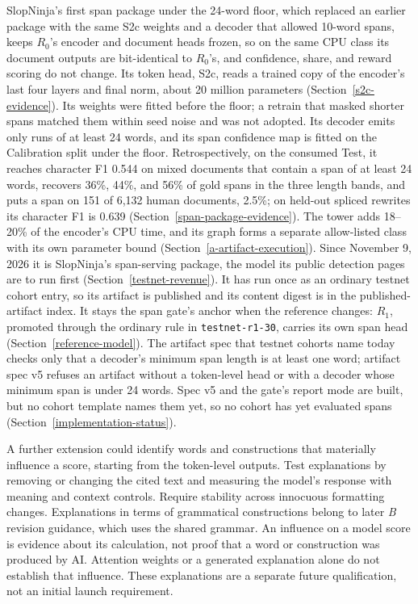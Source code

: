 SlopNinja's first span package under the 24-word floor, which replaced an
earlier package with the same S2c weights and a decoder that allowed 10-word
spans, keeps \(R_0\)'s encoder and document heads frozen, so on the same CPU class its document outputs are bit-identical to
\(R_0\)'s, and confidence, share, and reward scoring do not change. Its token head, S2c, reads a trained
copy of the encoder's last four layers and final norm, about 20 million
parameters (Section~\ref{s2c-evidence}). Its weights were fitted before the
floor; a retrain that masked shorter spans matched them within seed noise and
was not adopted. Its decoder emits only runs of at least 24 words, and its span
confidence map is fitted on the Calibration split under the floor. Retrospectively, on the consumed Test, it reaches character F1
0.544 on mixed documents that contain a span of at least 24 words, recovers
36\%, 44\%, and 56\% of gold spans in the three length bands, and puts a span on
151 of 6,132 human documents, 2.5\%; on held-out spliced rewrites its character
F1 is 0.639 (Section~\ref{span-package-evidence}). The tower adds 18--20\% of
the encoder's CPU time, and its graph forms a separate allow-listed class with
its own parameter bound (Section~\ref{a-artifact-execution}). Since November 9,
2026 it is SlopNinja's span-serving package, the model its public detection
pages are to run first (Section~\ref{testnet-revenue}). It has run once as an
ordinary testnet cohort entry, so its artifact is published and its content
digest is in the published-artifact index. It stays the span gate's anchor when
the reference changes: \(R_1\), promoted through the ordinary rule in
\texttt{testnet-r1-30}, carries its own span head (Section~\ref{reference-model}). The artifact
spec that testnet cohorts name today checks only that a decoder's minimum span
length is at least one word; artifact spec v5 refuses an artifact without a
token-level head or with a decoder whose minimum span is under 24 words. Spec v5
and the gate's report mode are built, but no cohort template names them yet, so
no cohort has yet evaluated spans (Section~\ref{implementation-status}).

A further extension could identify words and constructions that materially
influence a score, starting from the token-level outputs. Test explanations by
removing or changing the cited text and measuring the model's response with
meaning and context controls. Require stability across innocuous formatting
changes. Explanations in terms of grammatical constructions belong to later
\textit{B} revision guidance, which uses the shared grammar. An
influence on a model score is evidence about its calculation, not proof that a
word or construction was produced by AI. Attention weights or a generated
explanation alone do not establish that influence. These explanations are a
separate future qualification, not an initial launch requirement.

